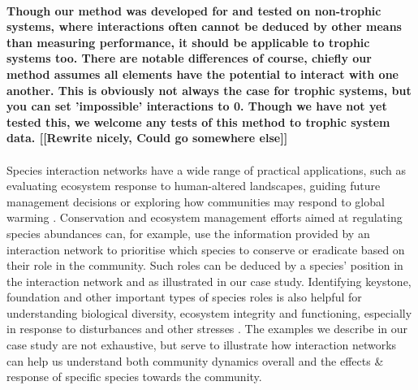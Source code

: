 \documentclass[a4,12pt]{article}
\begin{document}
    \paragraph{}
    \textbf{
    Though our method was developed for and tested on non-trophic systems, where interactions often cannot be deduced by other means than measuring performance, it should be applicable to trophic systems too. There are notable differences of course, chiefly our method assumes all elements have the potential to interact with one another. This is obviously not always the case for trophic systems, but you can set 'impossible' interactions to 0. Though we have not yet tested this, we welcome any tests of this method to trophic system data.
    [[Rewrite nicely, Could go somewhere else]]}

    \paragraph{}
    Species interaction networks have a wide range of practical applications, such as evaluating ecosystem response to human-altered landscapes, guiding future management decisions \parencite{Ross2011} or exploring how communities may respond to global warming \parencite{Gorman2019}. Conservation and ecosystem management efforts aimed at regulating species abundances can, for example, use the information provided by an interaction network to prioritise which species to conserve or eradicate based on their role in the community. Such roles can be deduced by a species' position in the interaction network \parencite{Cirtwill2018a} and as illustrated in our case study. Identifying keystone, foundation and other important types of species roles is also helpful for understanding biological diversity, ecosystem integrity and functioning, especially in response to disturbances and other stresses \parencite{Nyakatya2008, Orwin2016, Losapio2017, Narwani2019}. The examples we describe in our case study are not exhaustive, but serve to illustrate how interaction networks can help us understand both community dynamics overall and the effects \& response of specific species towards the community. 
\end{document}
